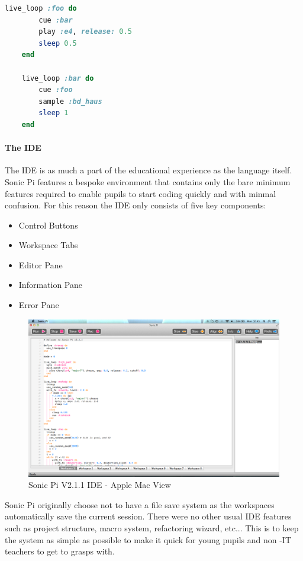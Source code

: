 \documentclass[11pt]{scrartcl}
\begin{document}
\begin{minipage}{\textwidth}
	\begin{lstlisting}[language = ruby]
	live_loop :foo do
	    cue :bar
	    play :e4, release: 0.5
	    sleep 0.5
	end

	live_loop :bar do
	    cue :foo
	    sample :bd_haus
	    sleep 1
	end
	\end{lstlisting}
\end{minipage}

\paragraph{The IDE}
The IDE is as much a part of the educational experience as the language 
itself. Sonic Pi features a bespoke environment that contains only the bare 
minimum features required to enable pupils to start coding quickly and with 
minmal confusion. For this reason the IDE only consists of five key components:

\begin{itemize}
	\item Control Buttons
	\item Workspace Tabs
	\item Editor Pane
	\item Information Pane
	\item Error Pane
\end{itemize}

\begin{figure}[t]
	\centering
	\includegraphics[width=\textwidth]{images/sonic-ide.png}
	\caption{Sonic Pi V2.1.1 IDE - Apple Mac View}
\end{figure}

Sonic Pi originally choose not to have a file save system as the workspaces 
automatically save the current session. There were no other usual IDE features 
such as project structure, macro system, refactoring wizard, etc... This is to 
keep the system as simple as possible to make it quick for young pupils and non
-IT teachers to get to grasps with.
\end{document}
